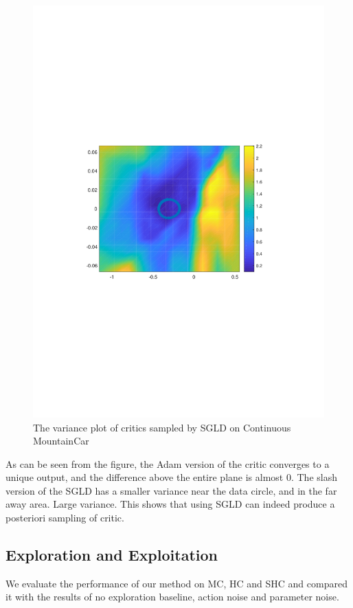 \begin{figure}[htb]
   \begin{center}   
   \centerline{\includegraphics[width=\columnwidth,trim=100 280 100 280,clip]{figs/mc_sgld_state.pdf}}
   \caption{The variance plot of critics sampled by SGLD on Continuous MountainCar}
   \label{fig:stateaction}   
   \end{center}
\end{figure}
As can be seen from the figure, the Adam version of the critic converges to a unique output, and the difference above the entire plane is almost 0. The slash version of the SGLD has a smaller variance near the data circle, and in the far away area. Large variance. This shows that using SGLD can indeed produce a posteriori sampling of critic.

\subsection{Exploration and Exploitation}
We evaluate the performance of our method on MC, HC and SHC and compared it with the results of no exploration baseline, action noise and parameter noise.

